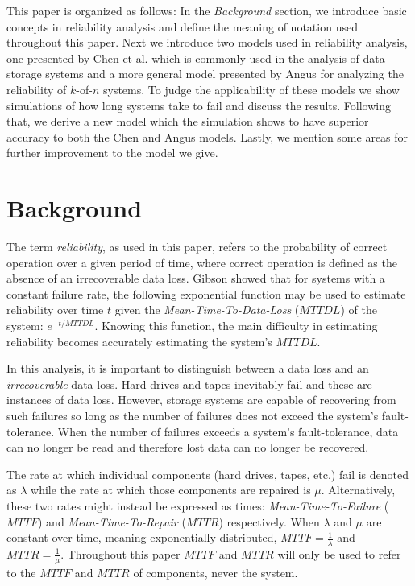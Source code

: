 \documentclass[XXX,endnotes]{usetex-v1}
\begin{document}
This paper is organized as follows:  In the \emph{Background} section, we introduce basic concepts in reliability analysis and define the meaning of notation used throughout this paper.  Next we introduce two models used in reliability analysis, one presented by Chen et al. which is commonly used in the analysis of data storage systems and a more general model presented by Angus for analyzing the reliability of $k$-of-$n$ systems.  To judge the applicability of these models we show simulations of how long systems take to fail and discuss the results.  Following that, we derive a new model which the simulation shows to have superior accuracy to both the Chen and Angus models.  Lastly, we mention some areas for further improvement to the model we give.

\section{Background}

The term \emph{reliability}, as used in this paper, refers to the probability of correct operation over a given period of time, where correct operation is defined as the absence of an irrecoverable data loss.  Gibson\cite{gibson} showed that for systems with a constant failure rate, the following exponential function may be used to estimate reliability over time $t$ given the \emph{Mean-Time-To-Data-Loss} ($MTTDL$) of the system: $e^{-t/MTTDL}$.  Knowing this function, the main difficulty in estimating reliability becomes accurately estimating the system's $MTTDL$. 

In this analysis, it is important to distinguish between a data loss and an \emph{irrecoverable} data loss.  Hard drives and tapes inevitably fail and these are instances of data loss.  However, storage systems are capable of recovering from such failures so long as the number of failures does not exceed the system's fault-tolerance.  When the number of failures exceeds a system's fault-tolerance, data can no longer be read and therefore lost data can no longer be recovered.

The rate at which individual components (hard drives, tapes, etc.) fail is denoted as $\lambda$ while the rate at which those components are repaired is $\mu$.  Alternatively, these two rates might instead be expressed as times: \emph{Mean-Time-To-Failure} ($MTTF$) and \emph{Mean-Time-To-Repair} ($MTTR$) respectively.  When $\lambda$ and $\mu$ are constant over time, meaning exponentially distributed, $MTTF = \frac{1}{\lambda}$ and $MTTR = \frac{1}{\mu}$.  Throughout this paper $MTTF$ and $MTTR$ will only be used to refer to the $MTTF$ and $MTTR$ of components, never the system.
\end{document}
